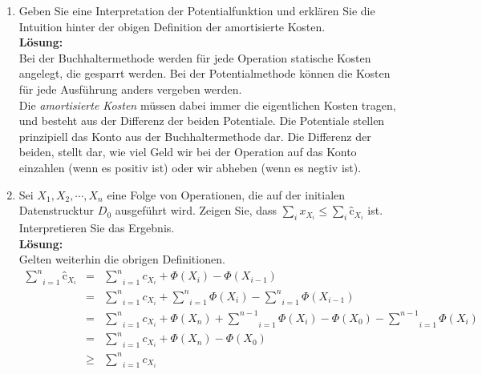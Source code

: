 \documentclass[11pt,a4paper,ngerman]{article}
\begin{document}
\begin{enumerate}[\bfseries (a)]

\item Geben Sie eine Interpretation der Potentialfunktion und erklären Sie die Intuition hinter der obigen Definition der amortisierte Kosten.\\

\textbf{Lösung:}\\

Bei der Buchhaltermethode werden für jede Operation statische Kosten angelegt, die gesparrt werden. Bei der Potentialmethode können die Kosten für jede Ausführung anders vergeben werden.\\

Die \emph{amortisierte Kosten} müssen dabei immer die eigentlichen Kosten tragen, und besteht aus der Differenz der beiden Potentiale. Die Potentiale stellen prinzipiell das Konto aus der Buchhaltermethode dar. Die Differenz der beiden, stellt dar, wie viel Geld wir bei der Operation auf das Konto einzahlen (wenn es positiv ist) oder wir abheben (wenn es negtiv ist).

\item Sei $X_1, X_2, \cdots , X_n$ eine Folge von Operationen, die auf der initialen Datenstrucktur $D_0$ ausgeführt wird. Zeigen Sie, dass $\underset{i}{\sum} x_{X_i} \leq \underset{i}{\sum} \text{\^{c}}_{X_i}$ ist. Interpretieren Sie das Ergebnis.\\

\textbf{Lösung:}\\

Gelten weiterhin die obrigen Definitionen.\\

$$
\begin{array}{rcl}
\underset{i=1}{\overset{n}{\sum}} \text{\^{c}}_{X_i} &=&\underset{i=1}{\overset{n}{\sum}} c_{X_i} + \Phi(X_i) - \Phi(X_{i-1}) \\
&=& \underset{i=1}{\overset{n}{\sum}} c_{X_i} + \underset{i=1}{\overset{n}{\sum}} \Phi(X_i)  - \underset{i=1}{\overset{n}{\sum}} \Phi (X_{i-1}) \\
&=& \underset{i=1}{\overset{n}{\sum}} c_{X_i} + \Phi(X_n) + \underset{i=1}{\overset{n-1}{\sum}} \Phi(X_i) - \Phi(X_0) - \underset{i=1}{\overset{n-1}{\sum}} \Phi (X_{i}) \\
&=& \underset{i=1}{\overset{n}{\sum}} c_{X_i} + \Phi (X_n) - \Phi (X_0)\\
&\geq& \underset{i=1}{\overset{n}{\sum}} c_{X_i}
\end{array}
$$


\end{enumerate}
\end{document}
